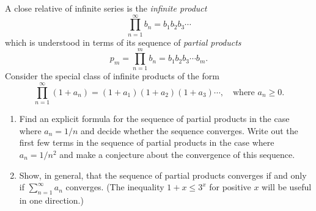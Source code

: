 \documentclass{lew98_solutions}
\begin{document}
\begin{exercise}
\label{ex:2.4.10}
    A close relative of infinite series is the \textit{infinite product}
    \[
        \prod_{n=1}^{\infty} b_n = b_1 b_2 b_3 \cdots
    \]
    which is understood in terms of its sequence of \textit{partial products}
    \[
        p_m = \prod_{n=1}^m b_n = b_1 b_2 b_3 \cdots b_m.
    \]
    Consider the special class of infinite products of the form
    \[
        \prod_{n=1}^{\infty} (1 + a_n) = (1 + a_1)(1 + a_2)(1 + a_3) \cdots, \quad \text{where } a_n \geq 0.
    \]
    \begin{enumerate}
        \item Find an explicit formula for the sequence of partial products in the case where \( a_n = 1/n \) and decide whether the sequence converges. Write out the first few terms in the sequence of partial products in the case where \( a_n = 1/n^2 \) and make a conjecture about the convergence of this sequence.

        \item Show, in general, that the sequence of partial products converges if and only if \( \sum_{n=1}^{\infty} a_n \) converges. (The inequality \( 1 + x \leq 3^x \) for positive \( x \) will be useful in one direction.)
    \end{enumerate}
\end{exercise}
\end{document}
